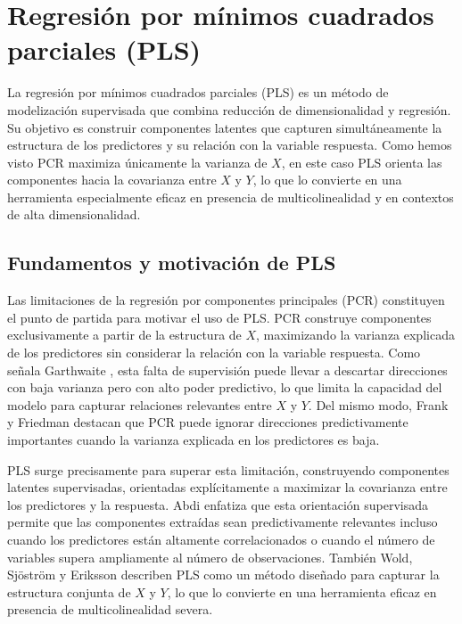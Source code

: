 \documentclass[12pt,a4paper]{report}
\begin{document}
\section{Regresión por mínimos cuadrados parciales (PLS)}

La regresión por mínimos cuadrados parciales (PLS) es un método de modelización supervisada que combina reducción de dimensionalidad y regresión. Su objetivo es construir componentes latentes que capturen simultáneamente la estructura de los predictores y su relación con la variable respuesta. Como hemos visto PCR maximiza únicamente la varianza de \(X\), en este caso PLS orienta las componentes hacia la covarianza entre \(X\) y \(Y\), lo que lo convierte en una herramienta especialmente eficaz en presencia de multicolinealidad y en contextos de alta dimensionalidad.

\subsection{Fundamentos y motivación de PLS}

Las limitaciones de la regresión por componentes principales (PCR) constituyen el punto de partida para motivar el uso de PLS. PCR construye componentes exclusivamente a partir de la estructura de \(X\), maximizando la varianza explicada de los predictores sin considerar la relación con la variable respuesta. Como señala Garthwaite \cite{garthwaite1994}, esta falta de supervisión puede llevar a descartar direcciones con baja varianza pero con alto poder predictivo, lo que limita la capacidad del modelo para capturar relaciones relevantes entre \(X\) y \(Y\). Del mismo modo, Frank y Friedman \cite{frank1993} destacan que PCR puede ignorar direcciones predictivamente importantes cuando la varianza explicada en los predictores es baja.

PLS surge precisamente para superar esta limitación, construyendo componentes latentes supervisadas, orientadas explícitamente a maximizar la covarianza entre los predictores y la respuesta. Abdi \cite{abdi2010} enfatiza que esta orientación supervisada permite que las componentes extraídas sean predictivamente relevantes incluso cuando los predictores están altamente correlacionados o cuando el número de variables supera ampliamente al número de observaciones. También Wold, Sjöström y Eriksson \cite{wold2001} describen PLS como un método diseñado para capturar la estructura conjunta de \(X\) y \(Y\), lo que lo convierte en una herramienta eficaz en presencia de multicolinealidad severa.
\end{document}
